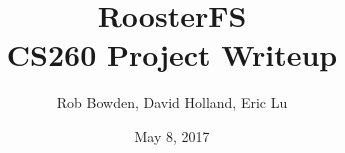 \documentclass[11pt, twocolumn, letterpaper]{article}
\title{RoosterFS \\ {\Large CS260 Project Writeup}}
\author{Rob Bowden, David Holland, Eric Lu}
\date{May 8, 2017}
\begin{document}
\maketitle




{
\footnotesize


}
\end{document}
